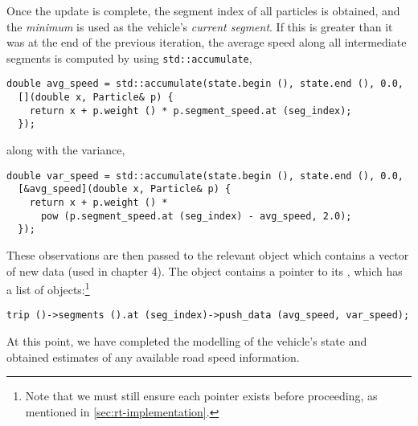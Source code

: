 Once the update is complete, the segment index of all particles is obtained, and the \emph{minimum} is used as the vehicle's \emph{current segment}. If this is greater than it was at the end of the previous iteration, the average speed along all intermediate segments is computed by using \verb+std::accumulate+,
\begin{lstlisting}
double avg_speed = std::accumulate(state.begin (), state.end (), 0.0,
  [](double x, Particle& p) {
    return x + p.weight () * p.segment_speed.at (seg_index);
  });
\end{lstlisting}\pagebreak
along with the variance,
\begin{lstlisting}
double var_speed = std::accumulate(state.begin (), state.end (), 0.0,
  [&avg_speed](double x, Particle& p) {
    return x + p.weight () *
      pow (p.segment_speed.at (seg_index) - avg_speed, 2.0);
  });
\end{lstlisting}
These observations are then passed to the relevant  object which contains a vector of new data (used in chapter 4). The  object contains a pointer to its , which has a list of  objects:\footnote{Note that we must still ensure each pointer exists before proceeding, as mentioned in \cref{sec:rt-implementation}.}
\begin{lstlisting}
trip ()->segments ().at (seg_index)->push_data (avg_speed, var_speed);
\end{lstlisting}

At this point, we have completed the modelling of the vehicle's state and obtained estimates of any available road speed information.

